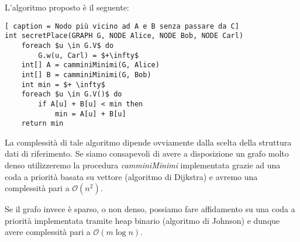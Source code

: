 \documentclass[../cheatSheetAlgoritmi.tex]{subfiles}
\begin{document}
L'algoritmo proposto è il seguente: 
\begin{lstlisting}[ caption = Nodo più vicino ad A e B senza passare da C]
int secretPlace(GRAPH G, NODE Alice, NODE Bob, NODE Carl)
	foreach $u \in G.V$ do
		G.w(u, Carl) = $+\infty$
	int[] A = camminiMinimi(G, Alice)
	int[] B = camminiMinimi(G, Bob)
	int min = $+ \infty$
	foreach $u \in G.V()$ do
		if A[u] + B[u] < min then
			min = A[u] + B[u]
	return min
\end{lstlisting}
La complessità di tale algoritmo dipende ovviamente dalla scelta della struttura dati di riferimento. Se siamo consapevoli di avere a disposizione un grafo molto denso utilizzeremo la procedura \emph{camminiMinimi} implementata grazie ad una coda a priorità basata su vettore (algoritmo di Dijkstra) e avremo una complessità pari a $\mathcal{O}(n^2)$. 

Se il grafo invece è sparso, o non denso, possiamo fare affidamento su una coda a priorità implementata tramite heap binario (algoritmo di Johnson) e dunque avere complessità pari a $\mathcal{O}(m \log n)$.
\newpage
\end{document}
